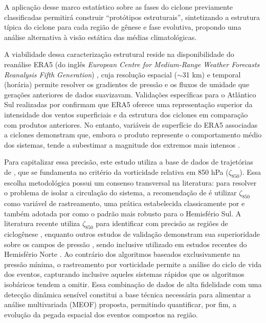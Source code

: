 A aplicação desse marco estatístico sobre as fases do ciclone previamente classificadas permitirá construir ``protótipos estruturais'', sintetizando a estrutura típica do ciclone para cada região de gênese e fase evolutiva, propondo uma análise alternativa à visão estática das médias climatológicas.


A viabilidade dessa caracterização estrutural reside na disponibilidade do reanálise ERA5 (do inglês \textit{European Centre for Medium-Range Weather Forecasts Reanalysis Fifth Generation}) \citep{hersbach2020era5}, cuja resolução espacial ($\sim$31 km) e temporal (horária) permite resolver os gradientes de pressão e os fluxos de umidade que gerações anteriores de dados suavizavam. Validações específicas para o Atlântico Sul realizadas por \citet{gramcianinov2020analysis} confirmam que ERA5 oferece uma representação superior da intensidade dos ventos superficiais e da estrutura dos ciclones em comparação com produtos anteriores. %
No entanto, variáveis de superfície do ERA5 associadas a ciclones demonstram que, embora o produto represente o comportamento médio dos sistemas, tende a subestimar a magnitude dos extremos mais intensos \citep{chen2024evaluation}.

Para capitalizar essa precisão, este estudo utiliza a base de dados de trajetórias de \citet{coutodesouza2024new}, que se fundamenta no critério da vorticidade relativa em 850 hPa ($\zeta_{850}$). Essa escolha metodológica possui um consenso transversal na literatura: para resolver o problema de isolar a circulação do sistema, a recomendação de \citet{sinclair1997objective} é utilizar $\zeta_{850}$ como variável de rastreamento, uma prática estabelecida classicamente por \citet{sinclair1994objective} e também adotada por \citet{padilhareinke2024objective} como o padrão mais robusto para o Hemisfério Sul. A literatura recente utiliza $\zeta_{850}$ para identificar com precisão as regiões de ciclogênese \citep{gramcianinov2019properties}, enquanto outros estudos de validação demonstram sua superioridade sobre os campos de pressão \citep{padilhareinke2024objective}, sendo inclusive utilizado em estudos recentes do Hemisfério Norte \citep{chen2025characteristics}. Ao contrário dos algoritmos baseados exclusivamente na pressão mínima, o rastreamento por vorticidade permite a análise do ciclo de vida dos eventos, capturando inclusive aqueles sistemas rápidos que os algoritmos isobáricos tendem a omitir. Essa combinação de dados de alta fidelidade com uma detecção dinâmica sensível constitui a base técnica necessária para alimentar a análise multivariada (MEOF) proposta, permitindo quantificar, por fim, a evolução da pegada espacial dos eventos compostos na região.


